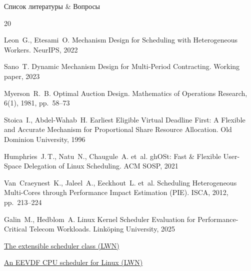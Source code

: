 \documentclass[aspectratio=169]{beamer}
\begin{document}
\begin{frame}{Список литературы \& Вопросы}
        \begin{thebibliography}{20}
                \scriptsize

                Leon~G., Etesami~O.
                Mechanism Design for Scheduling with Heterogeneous Workers.
                NeurIPS, 2022

                Sano~T.
                Dynamic Mechanism Design for Multi-Period Contracting.
                Working paper, 2023

                Myerson~R.~B.
                Optimal Auction Design.
                Mathematics of Operations Research, 6(1), 1981, pp.~58--73

                Stoica~I., Abdel-Wahab~H.
                Earliest Eligible Virtual Deadline First: A Flexible and
                Accurate Mechanism for Proportional Share Resource Allocation.
                Old Dominion University, 1996


                Humphries~J.\,T., Natu~N., Chaugule~A. et~al.
                ghOSt: Fast \& Flexible User-Space Delegation of
                Linux Scheduling.
                ACM SOSP, 2021

                Van~Craeynest~K., Jaleel~A., Eeckhout~L. et~al.
                Scheduling Heterogeneous Multi-Cores through
                Performance Impact Estimation (PIE).
                ISCA, 2012, pp.~213--224

                Galin~M., Hedblom~A.
                Linux Kernel Scheduler Evaluation for Performance-Critical
                Telecom Workloads.
                Linköping University, 2025

                \href{https://lwn.net/Articles/922405}
                {The extensible scheduler class (LWN)}

                \href{https://lwn.net/Articles/925371}
                {An EEVDF CPU scheduler for Linux (LWN)}

        \end{thebibliography}
\end{frame}


\appendix
\end{document}
